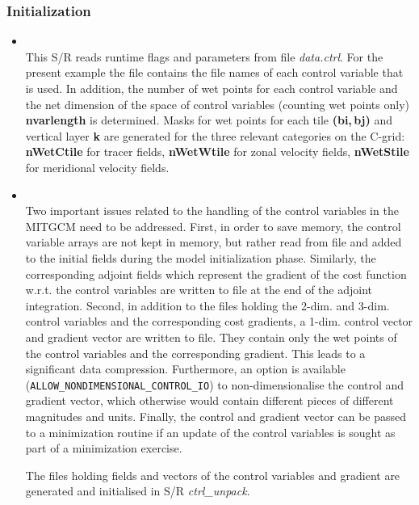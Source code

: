 \subsubsection{Initialization}
%
\begin{itemize}
%
\item 
{}
\\
%
This S/R 
reads runtime flags and parameters from file {\it data.ctrl}.
For the present example the file contains the file names
of each control variable that is used.
In addition, the number of wet points for each control
variable and the net dimension of the space of control
variables (counting wet points only) {\bf nvarlength}
is determined.
Masks for wet points for each tile {\bf (bi,\,bj)}
and vertical layer {\bf k} are generated for the three
relevant categories on the C-grid:
{\bf nWetCtile} for tracer fields, 
{\bf nWetWtile} for zonal velocity fields,
{\bf nWetStile} for meridional velocity fields.
%
\item 
{}
\\
%
Two important issues related to the handling of the control
variables in the MITGCM need to be addressed.
First, in order to save memory, the control variable arrays
are not kept in memory, but rather read from file and added
to the initial fields during the model initialization phase.
Similarly, the corresponding adjoint fields which represent
the gradient of the cost function w.r.t. the control variables
are written to file at the end of the adjoint integration.
Second, in addition to the files holding the 2-dim. and 3-dim.
control variables and the corresponding cost gradients, 
a 1-dim. {\sf control vector} 
and {\sf gradient vector} are written to file. They contain 
only the wet points of the control variables and the corresponding 
gradient.
This leads to a significant data compression.
Furthermore, an option is available
({\tt ALLOW\_NONDIMENSIONAL\_CONTROL\_IO}) to
non-dimensionalise the control and gradient vector,
which otherwise would contain different pieces of different
magnitudes and units.
Finally, the control and gradient vector can be passed to a 
minimization routine if an update of the control variables
is sought as part of a minimization exercise.

The files holding fields and vectors of the control variables
and gradient are generated and initialised in S/R {\it ctrl\_unpack}.
%
\end{itemize}

